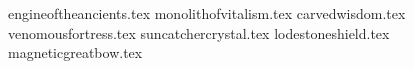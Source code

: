 
\howdahspecification{}
	\raggedcolumns  
\begin{multicols}{2}
\startsortedpricelist
{engineoftheancients.tex}
{monolithofvitalism.tex}
{carvedwisdom.tex}
{venomousfortress.tex}
{suncatchercrystal.tex}
{lodestoneshield.tex}
{magneticgreatbow.tex}
\endsortedpricelist
\end{multicols}{}